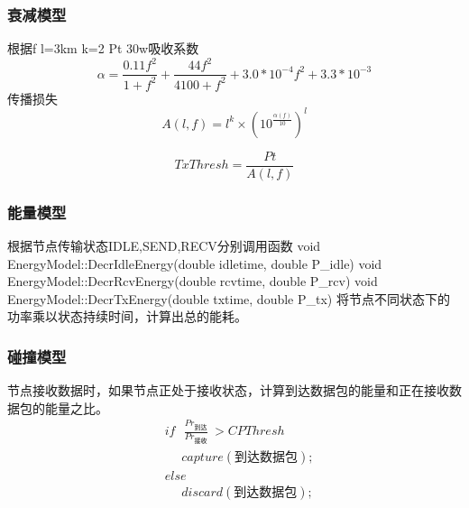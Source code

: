 \subsubsection{衰减模型}
根据f l=3km k=2 Pt 30w吸收系数
\begin{equation}
\alpha=\frac{0.11f^2}{1+f^2}+\frac{44f^2}{4100+f^2}+3.0*10^{-4}f^2+3.3*10^{-3}
\end{equation}
传播损失
\begin{equation}
A(l,f)=l^k\times(10^{\frac{\alpha (f)}{10}})^l
\end{equation}

\begin{equation}
TxThresh=\frac{Pt}{A(l,f)}
\end{equation}

\subsubsection{能量模型}
根据节点传输状态IDLE,SEND,RECV分别调用函数
void EnergyModel::DecrIdleEnergy(double idletime, double P\_idle)
void EnergyModel::DecrRcvEnergy(double rcvtime, double P\_rcv)
void EnergyModel::DecrTxEnergy(double txtime, double P\_tx)
将节点不同状态下的功率乘以状态持续时间，计算出总的能耗。

\subsubsection{碰撞模型}
节点接收数据时，如果节点正处于接收状态，计算到达数据包的能量和正在接收数据包的能量之比。
\begin{equation}
\begin{aligned}
&if \ \ \  \frac{Pr_{\mbox{到达}}}{Pr_{\mbox{接收}}}\  >CPThresh\\
&\ \ \ \ \ \ capture(\mbox{到达数据包});\\
&else\\
&\ \ \ \ \ \ discard(\mbox{到达数据包});
\end{aligned}
\end{equation}


